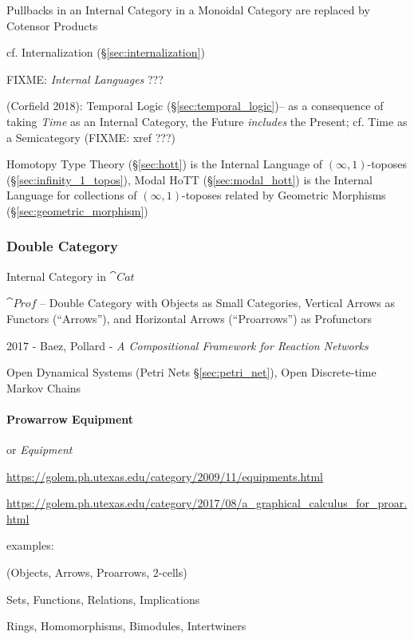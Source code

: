 Pullbacks in an Internal Category in a Monoidal Category are replaced
by Cotensor Products

\fist cf. Internalization (\S\ref{sec:internalization})

FIXME: \emph{Internal Languages} ???

(Corfield 2018): Temporal Logic (\S\ref{sec:temporal_logic})-- as a consequence
of taking \emph{Time} as an Internal Category, the Future \emph{includes} the
Present; cf. Time as a Semicategory (FIXME: xref ???)

Homotopy Type Theory (\S\ref{sec:hott}) is the Internal Language of
$(\infty,1)$-toposes (\S\ref{sec:infinity_1_topos}), Modal HoTT
(\S\ref{sec:modal_hott}) is the Internal Language for collections of
$(\infty,1)$-toposes related by Geometric Morphisms
(\S\ref{sec:geometric_morphism})



\subsubsection{Double Category}\label{sec:double_category}

Internal Category in $\cat{Cat}$

$\cat{Prof}$ -- Double Category with Objects as Small Categories, Vertical
Arrows as Functors (``Arrows''), and Horizontal Arrows (``Proarrows'') as
Profunctors

2017 - Baez, Pollard - \emph{A Compositional Framework for Reaction Networks}

Open Dynamical Systems (Petri Nets \S\ref{sec:petri_net}), Open Discrete-time
Markov Chains



\paragraph{Prowarrow Equipment}\label{sec:proarrow_equipment}\hfill

or \emph{Equipment}

\url{https://golem.ph.utexas.edu/category/2009/11/equipments.html}

\url{https://golem.ph.utexas.edu/category/2017/08/a_graphical_calculus_for_proar.html}

examples:

(Objects, Arrows, Proarrows, 2-cells)

Sets, Functions, Relations, Implications

Rings, Homomorphisms, Bimodules, Intertwiners

